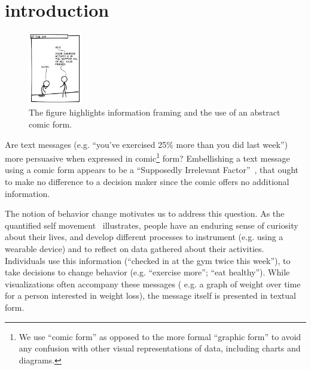 



\section{introduction}
\label{sec:introduction}

\begin{figure}
    \centering
    \includegraphics[width=0.21\textwidth]{figures/intro_new.png}
  \vspace{-10pt}
  \caption{The figure highlights information framing and the use of an abstract comic form.} \label{fig:intro}
  \vspace{-10pt}
\end{figure}

Are text messages (e.g. ``you've exercised 25\% more than you did last week'') more persuasive when expressed in comic\footnote{We use ``comic form'' as opposed to the more formal ``graphic form'' to avoid any confusion with other visual representations of data, including charts and diagrams.} form? Embellishing a text message using a comic form appears to be a ``Supposedly Irrelevant Factor''~\cite{Thaler2015}, that ought to make no difference to a decision maker since the comic offers no additional information.

The notion of behavior change motivates us to address this question. As the quantified self movement~\cite{Epstein2014,Choe2014} illustrates, people have an enduring sense of curiosity about their lives, and develop different processes to instrument (e.g. using a wearable device) and to reflect on data gathered about their activities. Individuals use this information (``checked in at the gym twice this week''), to take decisions to change behavior (e.g. ``exercise more''; ``eat healthy'').
 While visualizations often accompany these messages ( e.g. a graph of weight over time for a person interested in weight loss), the message itself is presented in textual form.

